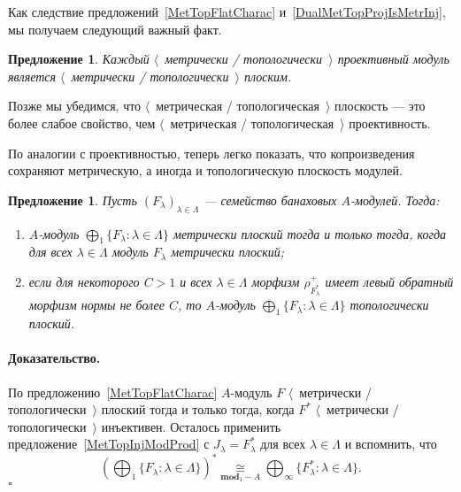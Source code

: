 \documentclass[12pt]{article}
\newcommand{\isom}[1]{\mathop{\mathbin{\cong}}\limits_{#1}}
\newtheorem{proposition}[theorem]{Предложение}
\renewenvironment{proof}{\paragraph{Доказательство.}}{\hfill$\square$\medskip}
\begin{document}
Как следствие предложений~\ref{MetTopFlatCharac}
и~\ref{DualMetTopProjIsMetrInj}, мы получаем следующий важный факт.

\begin{proposition}\label{MetTopProjIsMetTopFlat} Каждый $\langle$~метрически /
    топологически~$\rangle$ проективный модуль является $\langle$~метрически /
    топологически~$\rangle$ плоским.
\end{proposition}

Позже мы убедимся, что $\langle$~метрическая / топологическая~$\rangle$
плоскость --- это более слабое свойство, чем $\langle$~метрическая /
топологическая~$\rangle$ проективность.

По аналогии с проективностью, теперь легко показать, что копроизведения
сохраняют метрическую, а иногда и топологическую плоскость модулей.

\begin{proposition}\label{MetTopFlatModCoProd} Пусть
    ${(F_\lambda)}_{\lambda\in\Lambda}$ --- семейство банаховых $A$-модулей.
    Тогда:
    \begin{enumerate}[label = (\roman*)]
        \item $A$-модуль $\bigoplus_1 \{F_\lambda:\lambda\in\Lambda \}$ 
              метрически плоский тогда и только тогда, когда 
              для всех $\lambda\in\Lambda$ модуль 
              $F_\lambda$ метрически плоский;

        \item если для некоторого $C>1$ и всех $\lambda\in\Lambda$ морфизм
              $\rho_{F_\lambda^*}^+$ имеет левый обратный морфизм 
              нормы не более $C$, то $A$-модуль 
              $\bigoplus_1 \{F_\lambda:\lambda\in\Lambda \}$ 
              топологически плоский.
    \end{enumerate}

\end{proposition}
\begin{proof} По предложению~\ref{MetTopFlatCharac} $A$-модуль $F$
    $\langle$~метрически / топологически~$\rangle$ плоский тогда и только тогда,
    когда $F^*$ $\langle$~метрически / топологически~$\rangle$ инъективен.
    Осталось применить предложение~\ref{MetTopInjModProd} с
    $J_\lambda=F_\lambda^*$ для всех $\lambda\in\Lambda$ и вспомнить, что
    $$
        {\left(\bigoplus\nolimits_1 \{ F_\lambda:\lambda\in\Lambda \}\right)}^*
        \isom{\mathbf{mod}_1-A}
        \bigoplus\nolimits_\infty \{ F_\lambda^*:\lambda\in\Lambda \}.
    $$
\end{proof}
\end{document}
